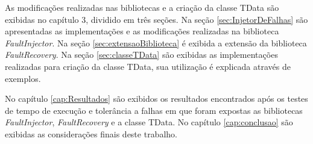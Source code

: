 As modificações realizadas nas bibliotecas e a criação da classe TData são exibidas no capítulo 3, dividido em três seções. Na seção \ref{sec:InjetorDeFalhas} são apresentadas as implementações e as modificações realizadas na biblioteca \textit{FaultInjector}. Na seção \ref{sec:extensaoBiblioteca} é exibida a extensão da biblioteca \textit{FaultRecovery}.  Na seção \ref{sec:classeTData} são exibidas as implementações realizadas para criação da classe TData, sua utilização é explicada através de exemplos.

No capítulo \ref{cap:Resultados} são exibidos os resultados encontrados após os testes de tempo de execução e tolerância a falhas em que foram expostas as bibliotecas \textit{FaultInjector}, \textit{FaultRecovery} e a classe TData. No capítulo \ref{cap:conclusao} são exibidas as considerações finais deste trabalho.


